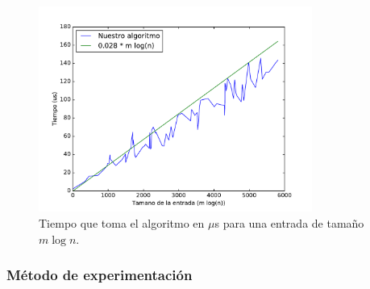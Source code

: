 \begin{figure}[H]
 \centering
	\includegraphics[width=0.8\textwidth]{img/exp/problema2-posta.pdf}
	\caption{\footnotesize Tiempo que toma el algoritmo en $\mu$s para una entrada de tamaño $m \log n$.}
	\label{fig:problema2-posta}
\end{figure}


\subsubsection{M\'etodo de experimentación}
